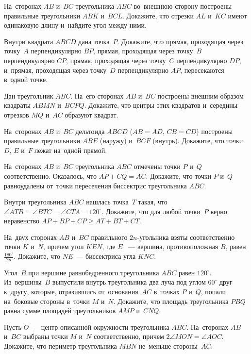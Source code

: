 


\begin{problems}

\item
На~сторонах $AB$ и~$BC$ треугольника $ABC$ во~внешнюю сторону построены
правильные треугольники $ABK$ и~$BCL$.
Докажите, что отрезки $AL$ и~$KC$ имеют одинаковую длину и~найдите угол между
ними.

\item
Внутри квадрата $ABCD$ дана точка~$P$.
Докажите, что прямая, проходящая через точку~$A$ перпендикулярно $BP$, прямая,
проходящая через точку~$B$ перпендикулярно $CP$, прямая, проходящая через
точку~$C$ перпендикулярно $DP$, и~прямая, проходящая через точку~$D$
перпендикулярно $AP$, пересекаются в~одной точке.

\item
Дан треугольник $ABC$.
На~его сторонах $AB$ и~$BC$ построены внешним образом квадраты $ABMN$ и~$BCPQ$.
Докажите, что центры этих квадратов и~середины отрезков $MQ$ и~$AC$ образуют
квадрат.

\item
На~сторонах $AB$ и~$BC$ дельтоида $ABCD$ ($AB = AD$, $CB = CD$) построены
правильные треугольники $ABE$ (наружу) и~$BCF$ (внутрь).
Докажите, что точки $D$, $E$ и~$F$ лежат на~одной прямой.

\item
На~сторонах $AB$ и~$BC$ треугольника $ABC$ отмечены точки $P$ и~$Q$
соответственно.
Оказалось, что $AP + CQ = AC$.
Докажите, что точки $P$ и~$Q$ равноудалены от~точки пересечения биссектрис
треугольника $ABC$.

\item
Внутри треугольника $ABC$ нашлась точка~$T$ такая, что
\( \angle ATB = \angle BTC = \angle CTA = 120^{\circ} \).
Докажите, что для любой точки~$P$ верно неравенство
\( AP + BP + CP \geq AT + BT + CT \).

\item
На~двух сторонах $AB$ и~$BC$ правильного $2n$-угольника взяты соответственно
точки $K$ и~$N$, причем угол $KEN$, где $E$ ~--- вершина, противоположная $B$,
равен $\frac{180^{\circ}}{2n}$.
Докажите, что $NE$~--- биссектриса угла $KNC$.

\item
Угол~$B$ при вершине равнобедренного треугольника $ABC$ равен $120^{\circ}$.
Из~вершины~$B$ выпустили внутрь треугольника два луча под углом $60^\circ$ друг
к~другу, которые, отразившись от~основания~$AC$ в~точках $P$ и~$Q$, попали
на~боковые стороны в~точки $M$ и~$N$.
Докажите, что площадь треугольника $PBQ$ равна сумме площадей треугольников
$AMP$ и~$CNQ$.

\item
Пусть $O$~--- центр описанной окружности треугольника $ABC$.
На~сторонах $AB$ и~$BC$ выбраны точки $M$ и~$N$ соответственно, причем
\( 2 \angle MON = \angle AOC \).
Докажите, что периметр треугольника $MBN$ не~меньше стороны~$AC$.

\end{problems}

